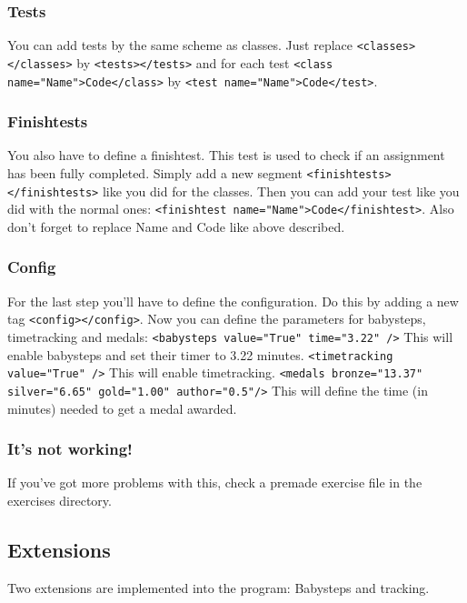 \documentclass[10pt,a4paper]{article}
\begin{document}
\subsubsection{Tests}
You can add tests by the same scheme as classes. Just replace \texttt{<classes></classes>} by \texttt{<tests></tests>} and for each test \texttt{<class name="Name">Code</class>} by \texttt{<test name="Name">Code</test>}.
\subsubsection{Finishtests}
You also have to define a finishtest. This test is used to check if an assignment has been fully completed. Simply add a new segment \texttt{<finishtests></finishtests>} like you did for the classes. Then you can add your test like you did with the normal ones: \texttt{<finishtest name="Name">Code</finishtest>}. Also don't forget to replace Name and Code like above described.
\subsubsection{Config}
For the last step you'll have to define the configuration. Do this by adding a new tag  \texttt{<config></config>}. \newline
Now you can define the parameters for babysteps, timetracking and medals: \newline\newline
\texttt{<babysteps value="True" time="3.22" />} This will enable babysteps and set their timer to 3.22 minutes. \newline\newline
\texttt{<timetracking value="True" />} This will enable timetracking. \newline\newline
\texttt{<medals bronze="13.37" silver="6.65" gold="1.00" author="0.5"/>} This will define the time (in minutes) needed to get a medal awarded. 

\subsubsection{It's not working!}
If you've got more problems with this, check a premade exercise file in the exercises directory.

\subsection{Extensions}
Two extensions are implemented into the program: Babysteps and tracking.
\end{document}
